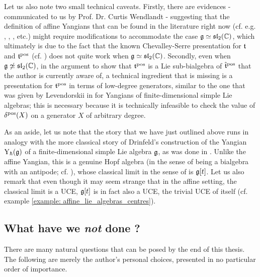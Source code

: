         Let us also note two small technical caveats. Firstly, there are evidences - communicated to us by Prof. Dr. Curtis Wendlandt - suggesting that the definition of affine Yangians that can be found in the literature right now (cf. e.g. \cite{moody_rao_yokonuma_vertex_representations_of_toroidal_lie_algebras}, \cite{guay_nakajima_wendlandt_affine_yangian_coproduct}, \cite{wendlandt_formal_shift_operators_on_yangian_doubles}, etc.) might require modifications to accommodate the case $\mathfrak{g} \simeq \mathfrak{sl}_2(\mathbb{C})$, which ultimately is due to the fact that the known Chevalley-Serre presentation for $\mathfrak{t}$ and $\mathfrak{t}^{\mathrm{pos}}$ (cf. \cite[Sections 3 and 4]{guay_nakajima_wendlandt_affine_yangian_vertex_representations_and_PBW}) does not quite work when $\mathfrak{g} \simeq \mathfrak{sl}_2(\mathbb{C})$. Secondly, even when $\mathfrak{g} \not \simeq \mathfrak{sl}_2(\mathbb{C})$, in the argument to show that $\mathfrak{t}^{\mathrm{pos}}$ is a Lie sub-bialgebra of $\hat{\mathfrak{t}}^{\mathrm{pos}}$ that the author is currently aware of, a technical ingredient that is missing is a presentation for $\mathfrak{t}^{\mathrm{pos}}$ in terms of low-degree generators, similar to the one that was given by Levendorskii in \cite{levendorskii_finite_type_yangians_presentation} for Yangians of finite-dimensional simple Lie algebras; this is necessary because it is technically infeasible to check the value of $\delta^{\mathrm{pos}}(X)$ on a generator $X$ of arbitrary degree.

        As an aside, let us note that the story that we have just outlined above runs in analogy with the more classical story of Drinfeld's construction of the Yangian $\mathrm{Y}_{\hbar}(\mathfrak{g})$ of a finite-dimensional simple Lie algebra $\mathfrak{g}$, as was done in \cite{drinfeld_original_yangian_paper}. Unlike the affine Yangian, this is a genuine Hopf algebra (in the sense of being a bialgebra with an antipode; cf. \cite[Chapter III]{kassel_quantum_groups}), whose classical limit in the sense of \cite{etingof_kazhdan_quantisation_1} is $\mathfrak{g}[t]$. Let us also remark that even though it may seem strange that in the affine setting, the classical limit is a UCE, $\mathfrak{g}[t]$ is in fact also a UCE, the trivial UCE of itself (cf. example \ref{example: affine_lie_algebras_centres}).

    \subsection{What have we \textit{not} done ?}
        There are many natural questions that can be posed by the end of this thesis. The following are merely the author's personal choices, presented in no particular order of importance.

